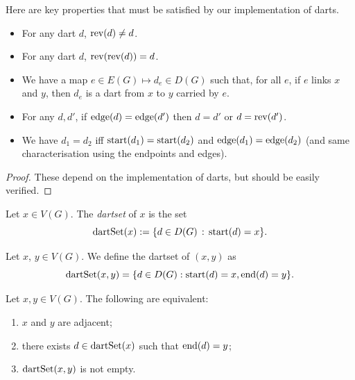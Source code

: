 Here are key properties that must be satisfied by our implementation of darts.

\begin{lemma}
  \label{lem:dart_API}
  \leanok
  \begin{itemize}
    \item For any dart $d$, $\mathrm{rev}(d) \neq d$.
    \item For any dart $d$, $\mathrm{rev}(\mathrm{rev}(d)) = d$.
    \item We have a map $e \in E(G) \mapsto d_e \in D(G)$ such that, for all $e$,
    if $e$ links $x$ and $y$, then $d_e$ is a dart from $x$ to $y$ carried by $e$.
    \item For any $d, d'$, if $\mathrm{edge}(d)=\mathrm{edge}(d')$ then $d=d'$ or $d=\mathrm{rev}(d')$.
    \item We have $d_1 = d_2$ iff $\mathrm{start}(d_1) = \mathrm{start}(d_2)$ and $\mathrm{edge}(d_1) = \mathrm{edge}(d_2)$
    (and same characterisation using the endpoints and edges).
  \end{itemize}
\end{lemma}

\begin{proof}
  \leanok
  These depend on the implementation of darts, but should be easily verified.
\end{proof}

\begin{definition}
  \label{def:dartset}
  \leanok
  Let $x \in V(G)$. The \emph{dartset} of $x$ is the set
  \begin{equation}
    \mathrm{dartSet}(x) := \{ d \in D(G) \, : \, \mathrm{start}(d)=x\}.
  \end{equation}
\end{definition}

\begin{definition}
  \label{def:dartset_pair}
  Let $x$, $y \in V(G)$.
  We define the dartset of $(x,y)$ as
  \begin{equation*}
    \mathrm{dartSet}(x,y)
    = \{ d \in D(G) : \mathrm{start}(d) = x, \mathrm{end}(d) = y\}.
  \end{equation*}
\end{definition}

\begin{lemma}
  \label{lem:adjacent_vs_dart}
  \leanok
  Let $x, y \in V(G)$.
  The following are equivalent:
  \begin{enumerate}
    \item $x$ and $y$ are adjacent;
    \item there exists $d \in \mathrm{dartSet}(x)$ such that $\mathrm{end}(d)=y$;
    \item $\mathrm{dartSet}(x,y)$ is not empty.
  \end{enumerate}
\end{lemma}

